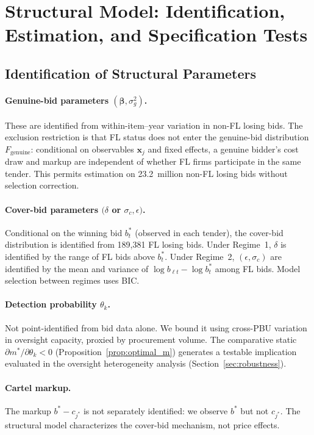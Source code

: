 \section{Structural Model: Identification, Estimation, and Specification Tests}
\label{app:structural_id}

\subsection{Identification of Structural Parameters}

\paragraph{Genuine-bid parameters $(\boldsymbol{\beta}, \sigma_g^2)$.}
These are identified from within-item--year variation in non-FL
losing bids. The exclusion restriction is that FL status does not
enter the genuine-bid distribution $F_{\text{genuine}}$: conditional
on observables $\mathbf{x}_j$ and fixed effects, a genuine bidder's
cost draw and markup are independent of whether FL firms participate
in the same tender. This permits estimation on 23.2~million non-FL
losing bids without selection correction.

\paragraph{Cover-bid parameters $(\delta$ or $\sigma_c, \epsilon)$.}
Conditional on the winning bid $b^*_t$ (observed in each tender),
the cover-bid distribution is identified from 189,381 FL losing
bids. Under Regime~1, $\delta$ is identified by the range of FL
bids above $b^*_t$. Under Regime~2, $(\epsilon, \sigma_c)$ are
identified by the mean and variance of $\log b_{\ell t} - \log b^*_t$
among FL bids. Model selection between regimes uses BIC.

\paragraph{Detection probability $\theta_k$.}
Not point-identified from bid data alone.
We bound it using cross-PBU variation in oversight capacity, proxied
by procurement volume. The comparative static $\partial m^* /
\partial \theta_k < 0$ (Proposition~\ref{prop:optimal_m}) generates
a testable implication evaluated in the oversight heterogeneity
analysis (Section~\ref{sec:robustness}).

\paragraph{Cartel markup.}
The markup $b^* - c_{j^*}$ is not separately identified: we observe
$b^*$ but not $c_{j^*}$. The structural model characterizes the
cover-bid mechanism, not price effects.

